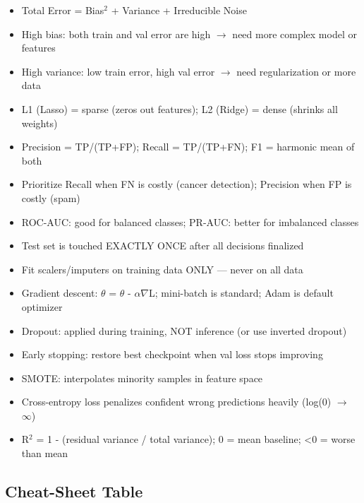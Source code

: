\documentclass[11pt]{article}
\providecommand{\tightlist}{\setlength{\itemsep}{1pt}\setlength{\parskip}{0pt}}
\begin{document}
\begin{itemize}
\tightlist
\item[$\square$]
  Total Error = Bias\(^2\) + Variance + Irreducible Noise
\item[$\square$]
  High bias: both train and val error are high \(\rightarrow\) need more complex model or features
\item[$\square$]
  High variance: low train error, high val error \(\rightarrow\) need regularization or more data
\item[$\square$]
  L1 (Lasso) = sparse (zeros out features); L2 (Ridge) = dense (shrinks all weights)
\item[$\square$]
  Precision = TP/(TP+FP); Recall = TP/(TP+FN); F1 = harmonic mean of both
\item[$\square$]
  Prioritize Recall when FN is costly (cancer detection); Precision when FP is costly (spam)
\item[$\square$]
  ROC-AUC: good for balanced classes; PR-AUC: better for imbalanced classes
\item[$\square$]
  Test set is touched EXACTLY ONCE after all decisions finalized
\item[$\square$]
  Fit scalers/imputers on training data ONLY --- never on all data
\item[$\square$]
  Gradient descent: \(\theta\) = \(\theta\) - \(\alpha\)\(\nabla\)L; mini-batch is standard; Adam is default optimizer
\item[$\square$]
  Dropout: applied during training, NOT inference (or use inverted dropout)
\item[$\square$]
  Early stopping: restore best checkpoint when val loss stops improving
\item[$\square$]
  SMOTE: interpolates minority samples in feature space
\item[$\square$]
  Cross-entropy loss penalizes confident wrong predictions heavily (log(0) \(\rightarrow\) \(\infty\))
\item[$\square$]
  R\(^2\) = 1 - (residual variance / total variance); 0 = mean baseline; \textless0 = worse than mean
\end{itemize}

\subsection{Cheat-Sheet Table}\label{cheat-sheet-table}
\end{document}
